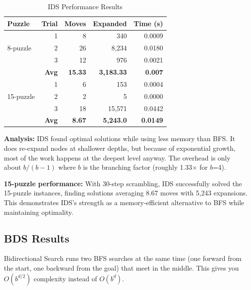 \documentclass[letterpaper]{article}
\begin{document}
\begin{table}[h]
\centering
\tiny
\begin{tabular}{lrrrr}
\toprule
\textbf{Puzzle} & \textbf{Trial} & \textbf{Moves} & \textbf{Expanded} & \textbf{Time (s)} \\
\midrule
\multirow{3}{*}{8-puzzle} & 1 & 8 & 340 & 0.0009 \\
& 2 & 26 & 8,234 & 0.0180 \\
& 3 & 12 & 976 & 0.0021 \\
\cmidrule{2-5}
& \textbf{Avg} & \textbf{15.33} & \textbf{3,183.33} & \textbf{0.007} \\
\midrule
\multirow{3}{*}{15-puzzle} & 1 & 6 & 153 & 0.0004 \\
& 2 & 2 & 5 & 0.0000 \\
& 3 & 18 & 15,571 & 0.0442 \\
\cmidrule{2-5}
& \textbf{Avg} & \textbf{8.67} & \textbf{5,243.0} & \textbf{0.0149} \\
\bottomrule
\end{tabular}
\caption{IDS Performance Results}
\end{table}

\textbf{Analysis:} IDS found optimal solutions while using less memory than BFS. It does re-expand nodes at shallower depths, but because of exponential growth, most of the work happens at the deepest level anyway. The overhead is only about $b/(b-1)$ where $b$ is the branching factor (roughly 1.33× for $b$=4).

\textbf{15-puzzle performance:} With 30-step scrambling, IDS successfully solved the 15-puzzle instances, finding solutions averaging 8.67 moves with 5,243 expansions. This demonstrates IDS's strength as a memory-efficient alternative to BFS while maintaining optimality.

\subsection{BDS Results}

Bidirectional Search runs two BFS searches at the same time (one forward from the start, one backward from the goal) that meet in the middle. This gives you $O(b^{d/2})$ complexity instead of $O(b^d)$.
\end{document}
